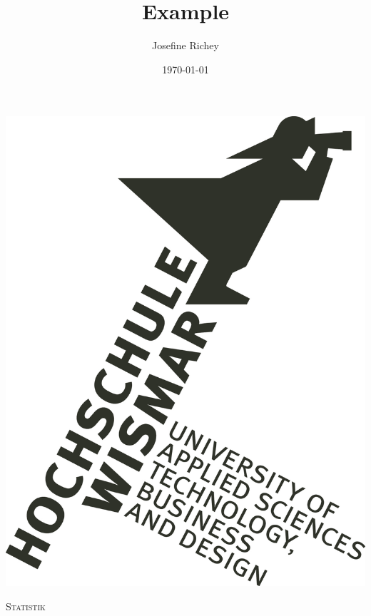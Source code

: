 \documentclass[11pt, a4paper]{article}
\title{Example}
\author{Josefine Richey}
\date{\today}
\def \aplmodul {Statistik}
\begin{document}
\begin{titlepage}

\center %


\noindent\begin{minipage}[t][0.3819660112501052\paperheight][t]{\textwidth}
\centering
\vspace{0.1458980337503154\paperheight}
\includegraphics[scale=0.382]{graphics/logo.jpg}
\end{minipage}

\textsc{\Large \aplmodul}
\vspace{0.5cm}


\end{titlepage}
\end{document}
